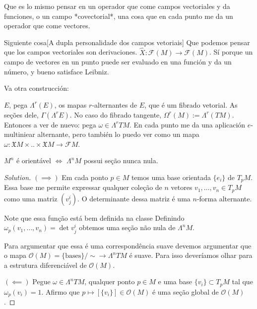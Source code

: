 \begin{upshot}\leavevmode
Que es lo mismo pensar en un operador que come campos vectoriales y da funciones, o un campo {\color{6}*covectorial*}, una cosa que en cada punto me da un operador que come vectores.
\end{upshot}

\begin{thing6}{Siguiente cosa}[A dupla personalidade dos campos vetoriais]\leavevmode
Que podemos pensar que los campos vectoriales son derivaciones. \(\hat{X}:\mathcal{F}(M) \to \mathcal{F}(M)\). Sí porque un campo de vectores en un punto puede ser evaluado en una función y da un número, y bueno satisface Leibniz.
\end{thing6}

Va otra construcción:

\(E\), pega \(\Lambda^{r}(E)\), os mapas \(r\)-alternantes de \(E\), que é um fibrado vetorial. As seções dele,  \(\Gamma(\Lambda^{r}E)\). No caso do fibrado tangente, \(\Omega^r(M):= \Lambda^{r}(TM)\). Entonces a ver de nuevo: pega \(\omega \in \Lambda^{r}TM\). En cada punto me da una aplicación \(e\)-multiniear alternante, pero también lo puedo ver como un mapa \(\omega: \mathfrak{X} M\times .. \times \mathfrak{X}M \to \mathcal{F}M\).

\begin{exercise}\leavevmode
\(M^n\) é orientável \(\iff\) \(\Lambda^{n}M\) possui seção nunca nula.
\end{exercise}

\begin{proof}[Solution]\leavevmode
\((\implies )\) Em cada ponto \(p \in M\) temos uma base orientada \(\{e_i\}\) de \(T_pM\). Essa base me permite expressar qualquer coleção de \(n\) vetores \(v_1,\ldots,v_n \in T_pM\) como uma matriz \((v^i_{j})\). O determinante dessa matriz é uma \(n\)-forma alternante. 

Note que essa função está bem definida na classe
Definindo  \(\omega_p(v_1,\ldots,v_n)=\det v^i_j\) obtemos uma seção não nula de \(\Lambda^{n}M\).

Para argumentar que essa é uma correspondência suave devemos argumentar que o mapa \(\mathcal{O}(M)=\{\text{bases} \}/\sim \longrightarrow \Lambda^{n}TM\) é suave. Para isso deveríamos olhar para a estrutura diferenciável de \(\mathcal{O}(M)\).

\((\impliedby)\) Pegue \(\omega \in \Lambda^{n}TM\), qualquer ponto \(p \in M\) e uma base \(\{v_i\}\subset T_pM\) tal que \(\omega_p(v_i)=1\). Afirmo que \(p \mapsto [\{v_i\}]\in \mathcal{O}(M)\) é uma seção global de \(\mathcal{O}(M)\).
\end{proof}

